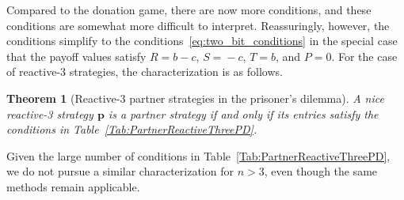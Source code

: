 \documentclass[9pt,twoside,lineno]{pnas-new}
\theoremstyle{plainCl1}
\newtheorem{theorem}{Theorem}
\theoremstyle{plainCl2}
\begin{document}
\noindent
Compared to the donation game, there are now more conditions, and these conditions are somewhat more difficult to interpret. Reassuringly, however, the conditions simplify to the conditions~\eqref{eq:two_bit_conditions} in the special case that the payoff values satisfy $R\!=\!b\!-\!c$, $S\!=\!-c$, $T\!=\!b$, and $P\!=\!0$. 
For the case of reactive-3 strategies, the characterization is as follows. 



\begin{theorem}[Reactive-3 partner strategies in the prisoner's dilemma]
\label{theorem:reactive_three_partner_strategies_PD}
A nice reactive-3 strategy $\mathbf{p}$ is a partner strategy if and only if its entries satisfy the conditions in Table~\ref{Tab:PartnerReactiveThreePD}. 
\end{theorem}

\noindent
Given the large number of conditions in Table~\ref{Tab:PartnerReactiveThreePD}, we do not pursue a similar characterization for $n\!>\!3$, even though the same methods remain applicable. \\
\end{document}
